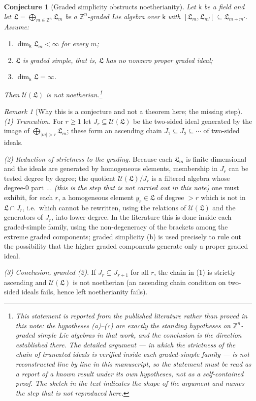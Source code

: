 \documentclass[11pt]{ctexart}
\theoremstyle{plain}
\newtheorem{conjecture}[theorem]{Conjecture}
\theoremstyle{definition}
\theoremstyle{remark}
\newtheorem{remark}[theorem]{Remark}
\newcommand{\kk}{\mathsf{k}}
\newcommand{\LL}{\mathfrak{L}}
\newcommand{\UU}{\mathcal{U}}
\begin{document}
\begin{conjecture}[Graded simplicity obstructs noetherianity]\label{thm:gradedsimple}
Let $\kk$ be a field and let $\LL=\bigoplus_{m\in\mathbb{Z}^n}\LL_m$ be a
$\mathbb{Z}^n$-graded Lie algebra over $\kk$ with $[\LL_m,\LL_{m'}]\subseteq
\LL_{m+m'}$. Assume:
\begin{enumerate}
\item[(a)] $\dim_\kk\LL_m<\infty$ for every $m$;
\item[(b)] $\LL$ is graded simple, that is, $\LL$ has no nonzero proper graded ideal;
\item[(c)] $\dim_\kk\LL=\infty$.
\end{enumerate}
Then $\UU(\LL)$ is not noetherian.\footnote{This statement is reported from the
published literature rather than proved in this note: the hypotheses (a)--(c) are
exactly the standing hypotheses on $\mathbb{Z}^n$-graded simple Lie algebras in that
work, and the conclusion is the direction established there. The detailed argument ---
in which the strictness of the chain of truncated ideals is verified inside each
graded-simple family --- is not reconstructed line by line in this manuscript, so the
statement must be read as a report of a known result under its own hypotheses, not as
a self-contained proof. The sketch in the text indicates the shape of the argument and
names the step that is not reproduced here.}
\end{conjecture}

\begin{remark}[Why this is a conjecture and not a theorem here; the missing step]\label{rem:gradedsimple-missing}
\emph{(1) Truncation.} For $r\ge1$ let $J_r\subseteq\UU(\LL)$ be the two-sided ideal
generated by the image of $\bigoplus_{|m|>r}\LL_m$; these form an ascending chain
$J_1\subseteq J_2\subseteq\cdots$ of two-sided ideals.

\emph{(2) Reduction of strictness to the grading.} Because each $\LL_m$ is
finite dimensional and the ideals are generated by homogeneous elements, membership in
$J_r$ can be tested degree by degree; the quotient $\UU(\LL)/J_r$ is a filtered
algebra whose degree-$0$ part ... \emph{(this is the step that is not carried out in
this note)} one must exhibit, for each $r$, a homogeneous element $y_r\in\LL$ of
degree $>r$ which is not in $\LL\cap J_r$, i.e.\ which cannot be rewritten, using the
relations of $\UU(\LL)$ and the generators of $J_r$, into lower degree. In the
literature this is done inside each graded-simple family, using the non-degeneracy of
the brackets among the extreme graded components; graded simplicity (b) is used
precisely to rule out the possibility that the higher graded components generate only
a proper graded ideal.

\emph{(3) Conclusion, granted (2).} If $J_r\subsetneq J_{r+1}$ for all $r$, the chain
in (1) is strictly ascending and $\UU(\LL)$ is not noetherian (an ascending chain
condition on two-sided ideals fails, hence left noetherianity fails).
\end{remark}
\end{document}

